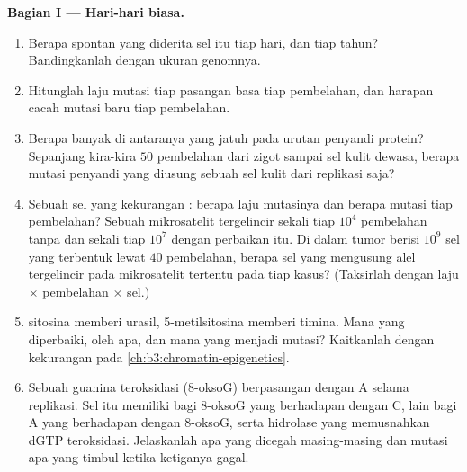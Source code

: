 \begin{problem}
\medskip
\noindent\textbf{Bagian I --- Hari-hari biasa.}
\begin{enumerate}
  \item Berapa  spontan yang diderita sel itu tiap hari,
        dan tiap tahun? Bandingkanlah dengan ukuran genomnya.
  \item Hitunglah laju mutasi tiap pasangan basa tiap pembelahan, dan
        harapan cacah mutasi baru tiap pembelahan.
  \item Berapa banyak di antaranya yang jatuh pada urutan penyandi protein?
        Sepanjang kira-kira $50$ pembelahan dari zigot sampai sel kulit
        dewasa, berapa mutasi penyandi yang diusung sebuah sel kulit dari
        replikasi saja?
  \item Sebuah sel yang kekurangan : berapa laju
        mutasinya dan berapa mutasi tiap pembelahan? Sebuah mikrosatelit
        tergelincir sekali tiap $10^{4}$ pembelahan tanpa  dan sekali tiap $10^{7}$ dengan perbaikan itu. Di dalam
        tumor berisi $10^{9}$ sel yang terbentuk lewat $40$ pembelahan,
        berapa sel yang mengusung alel tergelincir pada mikrosatelit
        tertentu pada tiap kasus? (Taksirlah dengan laju $\times$
        pembelahan $\times$ sel.)
  \item {} sitosina memberi urasil,  5-metilsitosina
        memberi timina. Mana yang diperbaiki, oleh apa, dan mana yang
        menjadi mutasi? Kaitkanlah dengan kekurangan  pada
        \cref{ch:b3:chromatin-epigenetics}.
  \item Sebuah guanina teroksidasi (8-oksoG) berpasangan dengan A selama
        replikasi. Sel itu memiliki  bagi 8-oksoG yang
        berhadapan dengan C,  lain bagi A yang berhadapan
        dengan 8-oksoG, serta hidrolase yang memusnahkan dGTP teroksidasi.
        Jelaskanlah apa yang dicegah masing-masing dan mutasi apa yang
        timbul ketika ketiganya gagal.
\end{enumerate}


\end{problem}
